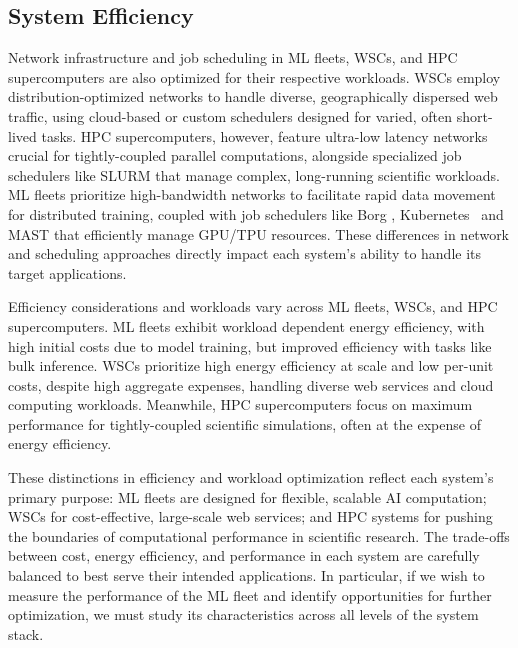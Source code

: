 \subsection{System Efficiency}

Network infrastructure and job scheduling  in ML fleets, WSCs, and HPC supercomputers are also optimized for their respective workloads. WSCs employ distribution-optimized networks to handle diverse, geographically dispersed web traffic, using cloud-based or custom schedulers \cite{burns2016borg} designed for varied, often short-lived tasks. HPC supercomputers, however, feature ultra-low latency networks crucial for tightly-coupled parallel computations, alongside specialized job schedulers like SLURM\cite{yoo2003slurm} that manage complex, long-running scientific workloads. ML fleets prioritize high-bandwidth networks \cite{zu2024resiliency} to facilitate rapid data movement for distributed training, coupled with job schedulers like Borg \cite{verma2015borg}, Kubernetes~\cite{rensin2015kubernetes} and MAST\cite{choudhury2024mast} that efficiently manage GPU/TPU resources. These differences in network and scheduling approaches directly impact each system's ability to handle its target applications.

Efficiency considerations and workloads vary across ML fleets, WSCs, and HPC supercomputers. ML fleets exhibit workload dependent energy efficiency, with high initial costs due to model training, but improved efficiency with tasks like bulk inference. WSCs prioritize high energy efficiency at scale and low per-unit costs, despite high aggregate expenses, handling diverse web services \cite{spanner} and cloud computing workloads. Meanwhile, HPC supercomputers focus on maximum performance for tightly-coupled scientific simulations, often at the expense of energy efficiency\cite{kamil2008power}. 

These distinctions in efficiency and workload optimization reflect each system's primary purpose: ML fleets are designed for flexible, scalable AI computation; WSCs for cost-effective, large-scale web services; and HPC systems for pushing the boundaries of computational performance in scientific research. The trade-offs between cost, energy efficiency, and performance in each system are carefully balanced to best serve their intended applications. In particular, if we wish to measure the performance of the ML fleet and identify opportunities for further optimization, we must study its characteristics across all levels of the system stack. 

